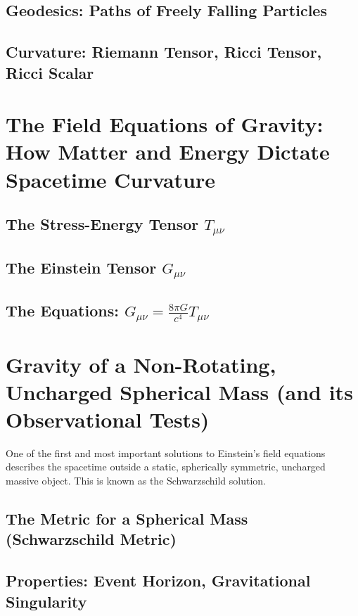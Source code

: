 \documentclass{amsart}
\theoremstyle{definition}
\theoremstyle{remark}
\begin{document}
\subsection{Geodesics: Paths of Freely Falling Particles}
\subsection{Curvature: Riemann Tensor, Ricci Tensor, Ricci Scalar}

\section{The Field Equations of Gravity: How Matter and Energy Dictate Spacetime Curvature}
\label{sec:efe}
\subsection{The Stress-Energy Tensor $T_{\mu\nu}$}
\subsection{The Einstein Tensor $G_{\mu\nu}$}
\subsection{The Equations: $G_{\mu\nu} = \frac{8\pi G}{c^4} T_{\mu\nu}$}

\section{Gravity of a Non-Rotating, Uncharged Spherical Mass (and its Observational Tests)}
\label{sec:schwarzschild_tests}
One of the first and most important solutions to Einstein's field equations describes the spacetime outside a static, spherically symmetric, uncharged massive object. This is known as the Schwarzschild solution.

\subsection{The Metric for a Spherical Mass (Schwarzschild Metric)}

\subsection{Properties: Event Horizon, Gravitational Singularity}
\end{document}

